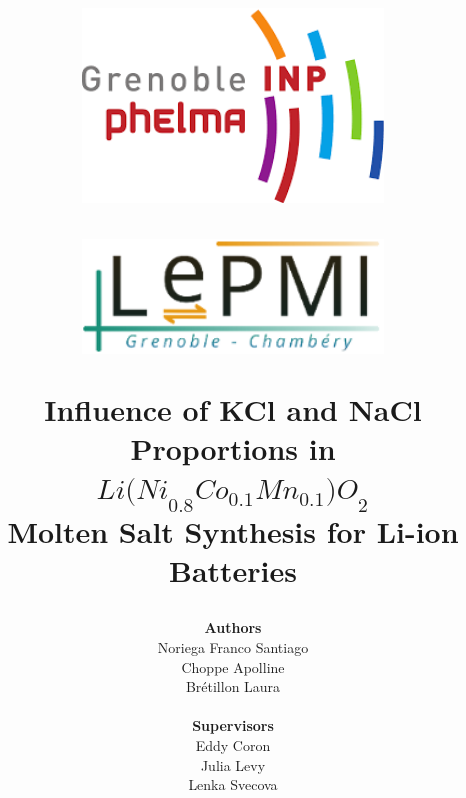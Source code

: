 \documentclass{article}
\begin{document}
\title{
  \vspace{-3cm}  %
  \begin{minipage}{0.48\textwidth}
     \raggedright  %
    \includegraphics[width=0.6\textwidth]{images.png}  %
   \vspace{2cm}
  \end{minipage}
  \begin{minipage}{0.48\textwidth}
    \raggedleft
 
    \includegraphics[width=0.6\textwidth]{lepmi_logo.png}
    \vspace{2cm}
  \end{minipage}
  \vspace{2cm}

  \textbf{\Large Influence of KCl and NaCl Proportions in\\
  ${Li(Ni}_{0.8}{Co}_{0.1}{Mn}_{0.1}{)O}_{2}$ \\ 
  \vspace{0.3cm}
  \textbf{\Large Molten Salt Synthesis for Li-ion Batteries}
    \vspace{4cm}
  }
 

\author{
  \textbf{Authors}\\
  Noriega Franco Santiago \\
  Choppe Apolline \\
  Brétillon Laura\\
  \\
  \textbf{Supervisors}\\
  Eddy Coron\\
  Julia Levy\\
  Lenka Svecova}


}
\end{document}

